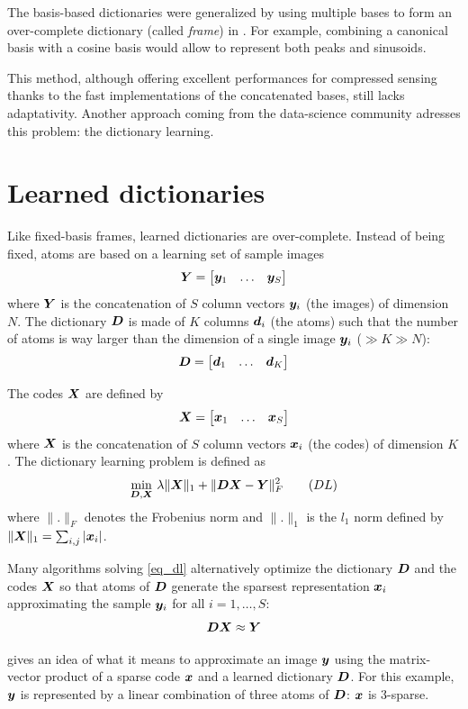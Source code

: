 The basis-based dictionaries were generalized by using multiple bases to form an over-complete dictionary (called \emph{frame}) in \cite{chen_atomic_2001}. For example, combining a canonical basis with a cosine basis would allow to represent both peaks and sinusoids.

This method, although offering excellent performances for compressed sensing thanks to the fast implementations of the concatenated bases, still lacks adaptativity. Another approach coming from the data-science community adresses this problem: the dictionary learning.

\section{Learned dictionaries}

Like fixed-basis frames, learned dictionaries are over-complete. Instead of being fixed, atoms are based on a learning set of sample images
$$\bm{Y} = \begin{bmatrix} \bm{y}_1 & \dots & \bm{y}_S \end{bmatrix}$$
where $\bm{Y}$ is the concatenation of $S$ column vectors $\bm{y}_i$ (the images) of dimension $N$. The dictionary $\bm{D}$ is made of $K$ columns $\bm{d}_i$ (the atoms) such that the number of atoms is way larger than the dimension of a single image $\bm{y}_i$ ($ \gg K \gg N$):
$$\bm{D} = \begin{bmatrix} \bm{d}_1 & \dots & \bm{d}_K \end{bmatrix}$$

The codes $\bm{X}$ are defined by
$$\bm{X} = \begin{bmatrix} \bm{x}_1 & \dots & \bm{x}_S \end{bmatrix}$$
where $\bm{X}$ is the concatenation of $S$ column vectors $\bm{x}_i$ (the codes) of dimension $K$. The dictionary learning problem is defined as
\begin{align}
\underset{\bm{D},\bm{X}}{\min}~ \lambda \lVert \bm{X} \rVert_1 + \lVert \bm{D}\bm{X}-\bm{Y} \rVert^2_F \tag{$DL$} \label{eq_dl}
\end{align}
where $\lVert . \rVert_F$ denotes the Frobenius norm and $\lVert . \rVert_1$ is the $l_1$ norm defined by $\lVert \bm{X} \rVert_1 = \sum_{i,j} |\bm{x}_i|$.

Many algorithms solving \eqref{eq_dl} alternatively optimize the dictionary $\bm{D}$ and the codes $\bm{X}$ so that atoms of $\bm{D}$ generate the sparsest representation $\bm{x}_i$ approximating the sample $\bm{y}_i$ for all $i = 1,\dots,S$:
$$\bm{D}\bm{X} \approx \bm{Y}$$

 gives an idea of what it means to approximate an image $\bm{y}$ using the matrix-vector product of a sparse code $\bm{x}$ and a learned dictionary $\bm{D}$. For this example, $\bm{y}$ is represented by a linear combination of three atoms of $\bm{D}$: $\bm{x}$ is 3-sparse.

